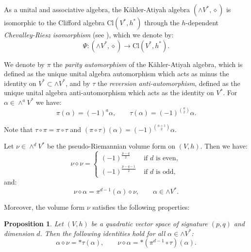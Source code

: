 \documentclass[10pt,a4paper,twoside,reqno]{amsart}
\theoremstyle{plain}
\newtheorem{prop}[thm]{Proposition}
\theoremstyle{definition}
\theoremstyle{remark}
\begin{document}
As a unital and associative algebra, the Kähler-Atiyah algebra $(\wedge V^*,\diamond)$ is isomorphic to the Clifford algebra $\mathrm{Cl}(V^*,h^*)$ through the $h$-dependent \emph{Chevalley-Riesz isomorphism} (see \cite{CLS21,LBC13,LBC16}), which we denote by: \begin{equation}\label{eq:ChevRiesz_iso}
    \Psi\colon(\wedge V^*,\diamond)\to\mathrm{Cl}(V^*,h^*).
\end{equation}

We denote by $\pi$ the \emph{parity automorphism} of the Kähler-Atiyah algebra, which is defined as the unique unital algebra automorphism which acts as minus the identity on $V^*\subset\wedge V^*$, and by $\tau$ the \emph{reversion anti-automorphism}, defined as the unique unital algebra anti-automorphism which acts as the identity on $V^*$. For $\alpha\in\wedge^aV^*$ we have: \begin{equation*}
    \pi(\alpha)=(-1)^a\alpha,\qquad\tau(\alpha)=(-1)^{\binom{a}{2}}\alpha.
\end{equation*}

Note that $\tau\circ\pi=\pi\circ\tau$ and $(\pi\circ\tau)(\alpha)=(-1)^{\binom{a+1}{2}}\alpha$.\medskip

Let $\nu\in\wedge^dV^*$ be the pseudo-Riemannian volume form on $(V,h)$. Then we have: $$\nu\diamond\nu=\begin{cases}
    (-1)^{\frac{p-q}{2}}&\mbox{ if $d$ is even},\\
    (-1)^{\frac{p-q-1}{2}}&\mbox{ if $d$ is odd},
\end{cases}$$ and: $$\nu\diamond\alpha=\pi^{d-1}(\alpha)\diamond\nu,\qquad \alpha\in\wedge V^*.$$

Moreover, the volume form $\nu$ satisfies the following properties:

\begin{prop}\label{prop:product_volume_form}
Let $(V,h)$ be a quadratic vector space of signature $(p,q)$ and dimension $d$. Then the following identities hold for all $\alpha\in\wedge V^*$:
\begin{equation}\label{eq:diamond_volume}
    \alpha\diamond\nu=*\tau(\alpha),\qquad \nu\diamond\alpha=*(\pi^{d-1}\circ\tau)(\alpha).
\end{equation}
\end{prop}
\end{document}
